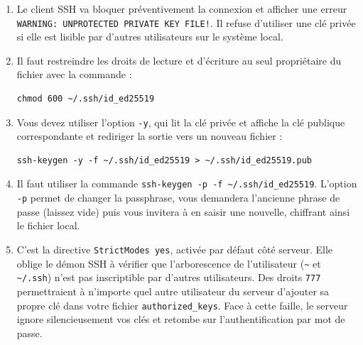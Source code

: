 \documentclass[11pt, a4paper]{article}
\begin{document}
\begin{enumerate}
    \item Le client SSH va bloquer préventivement la connexion et afficher une erreur \texttt{WARNING: UNPROTECTED PRIVATE KEY FILE!}. Il refuse d'utiliser une clé privée si elle est lisible par d'autres utilisateurs sur le système local.
    \item Il faut restreindre les droits de lecture et d'écriture au seul propriétaire du fichier avec la commande : 
    \begin{verbatim}chmod 600 ~/.ssh/id_ed25519\end{verbatim}
    \item Vous devez utiliser l'option \texttt{-y}, qui lit la clé privée et affiche la clé publique correspondante et rediriger la sortie vers un nouveau fichier : 
    \begin{verbatim}ssh-keygen -y -f ~/.ssh/id_ed25519 > ~/.ssh/id_ed25519.pub\end{verbatim}
    \item Il faut utiliser la commande \texttt{ssh-keygen -p -f \~{}/.ssh/id\_ed25519}. L'option \texttt{-p} permet de changer la passphrase, vous demandera l'ancienne phrase de passe (laissez vide) puis vous invitera à en saisir une nouvelle, chiffrant ainsi le fichier local.
    \item C'est la directive \texttt{StrictModes yes}, activée par défaut côté serveur. Elle oblige le démon SSH à vérifier que l'arborescence de l'utilisateur (\texttt{\~{}} et \texttt{\~{}/.ssh}) n'est pas inscriptible par d'autres utilisateurs. Des droits \texttt{777} permettraient à n'importe quel autre utilisateur du serveur d'ajouter sa propre clé dans votre fichier \texttt{authorized\_keys}. Face à cette faille, le serveur ignore silencieusement vos clés et retombe sur l'authentification par mot de passe.
\end{enumerate}
\end{document}
